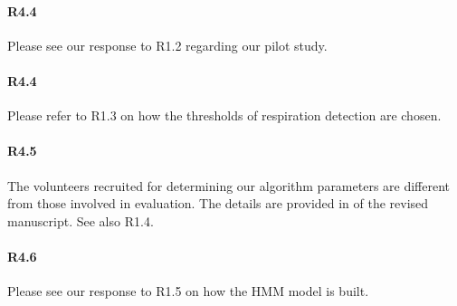 \paragraph{R4.4} Please see our response to R1.2 regarding our pilot study.

\paragraph{R4.4} Please refer to R1.3 on how the thresholds of respiration detection are chosen.

\paragraph{R4.5} The volunteers recruited for determining our algorithm parameters are different from those involved in
 evaluation. The details are provided in  of the revised manuscript. See also R1.4.

 \paragraph{R4.6} Please see our response to R1.5 on how the HMM model is built. 
